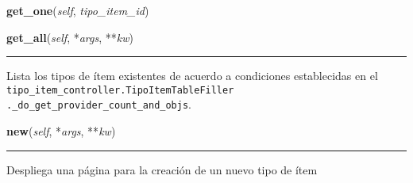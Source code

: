 \hspace{.8\funcindent}\begin{boxedminipage}{\funcwidth}

    \raggedright \textbf{get\_one}(\textit{self}, \textit{tipo\_item\_id})

\setlength{\parskip}{2ex}
\setlength{\parskip}{1ex}
    \end{boxedminipage}

    \label{saip:controllers:tipo_item_controller:TipoItemController:get_all}

    \vspace{0.5ex}

\hspace{.8\funcindent}\begin{boxedminipage}{\funcwidth}

    \raggedright \textbf{get\_all}(\textit{self}, *\textit{args}, **\textit{kw})

    \vspace{-1.5ex}

    \rule{\textwidth}{0.5\fboxrule}
\setlength{\parskip}{2ex}
    Lista los tipos de ítem existentes de acuerdo a condiciones 
    establecidas en el \texttt{tipo\_item\_controller.TipoItemTableFiller 
    .\_do\_get\_provider\_count\_and\_objs}.

\setlength{\parskip}{1ex}
    \end{boxedminipage}

    \label{saip:controllers:tipo_item_controller:TipoItemController:new}

    \vspace{0.5ex}

\hspace{.8\funcindent}\begin{boxedminipage}{\funcwidth}

    \raggedright \textbf{new}(\textit{self}, *\textit{args}, **\textit{kw})

    \vspace{-1.5ex}

    \rule{\textwidth}{0.5\fboxrule}
\setlength{\parskip}{2ex}
    Despliega una página para la creación de un nuevo tipo de ítem

\setlength{\parskip}{1ex}
    \end{boxedminipage}


